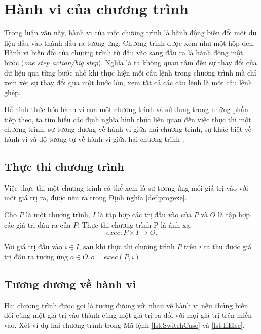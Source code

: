 \section{Hành vi của chương trình }
\label{sec:behavior}

Trong luận văn này, hành vi của một chương trình là hành động biến đổi
một dữ liệu đầu vào thành đầu ra tương ứng. Chương trình được xem như
một hộp đen. Hành vi biến đổi của chương trình từ đầu vào sang đầu ra
là hành động một bước (\emph{one step action/big step}). Nghĩa là ta
không quan tâm đến sự thay đổi của dữ liệu qua từng bước nhỏ khi thực
hiện mỗi câu lệnh trong chương trình mà chỉ xem xét sự thay đổi qua
một bước lớn, xem tất cả các câu lệnh là một câu lệnh ghép.

Để hình thức hóa hành vi của một chương trình và sử dụng trong những
phần tiếp theo, ta tìm hiểu các định nghĩa hình thức liên quan đến
việc thực thi một chương trình, sự tương đương về hành vi giữa hai
chương trình, sự khác biệt về hành vi và độ tương tự về hành vi giữa
hai chương trình \cite{li2016measuring}.
        
\subsection{Thực thi chương trình}

Việc thực thi một chương trình có thể xem là sự tương ứng mỗi giá trị vào với một giá trị ra, được nêu ra trong Định nghĩa \ref{def:progexe}.

\begin{definition}
  \label{def:progexe}
  Cho $P$ là một chương trình, $I$ là tập hợp các trị đầu vào của $P$
  và $O$ là tập hợp các giá trị đầu ra của $P$. Thực thi chương trình
  P là ánh xạ:
  \[exec: P \times I \rightarrow O.
  \]
\end{definition}

Với giá trị đầu vào $i \in I$, sau khi thực thi chương trình $P$ trên
$i$ ta thu được giá trị đầu ra tương ứng $o \in O, o = exec(P, i)$.

\subsection{Tương đương về hành vi}

Hai chương trình được gọi là tương đương với nhau về hành vi nếu chúng
biến đổi cùng một giá trị vào thành cùng một giá trị ra đối với mọi
giá trị trên miền vào. Xét ví dụ hai chương trình trong Mã lệnh
\ref{lst:SwitchCase} và \ref{lst:IfElse}.

